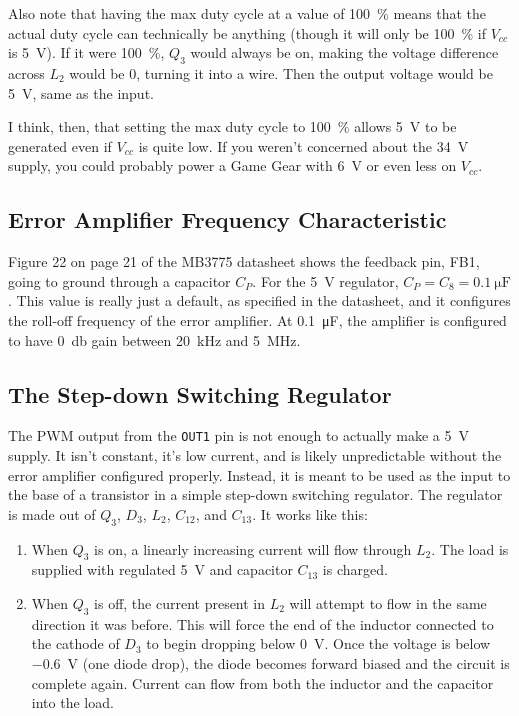 \documentclass{article}
\newcommand{\Vcc}{$V_{cc}$}
\newcommand{\chippin}{\texttt}
\newcommand{\model}{\textsf}
\begin{document}
Also note that having the max duty cycle at a value of \qty{100}{\%}
means that the actual duty cycle can technically be anything (though
it will only be \qty{100}{\%} if \Vcc{} is \qty{5}{\volt}). If it were
\qty{100}{\%}, $Q_3$ would always be on, making the voltage difference
across $L_2$ would be 0, turning it into a wire. Then the output
voltage would be \qty{5}{\volt}, same as the input.

I think, then, that setting the max duty cycle to \qty{100}{\%} allows
\qty{5}{\volt} to be generated even if \Vcc{} is quite low. If you
weren't concerned about the \qty{34}{\volt} supply, you could probably
power a Game Gear with \qty{6}{\volt} or even less on \Vcc{}.


\subsection{Error Amplifier Frequency Characteristic}
Figure 22 on page 21 of the \model{MB3775} datasheet shows the
feedback pin, FB1, going to ground through a capacitor $C_P$. For the
\qty{5}{\volt} regulator, $C_P = C_8 = \qty{0.1}{\micro\farad}$. This
value is really just a default, as specified in the datasheet, and it
configures the roll-off frequency of the error amplifier. At
\qty{0.1}{\micro\farad}, the amplifier is configured to have
\qty{0}{\decibel} gain between \qty{20}{\kilo\hertz} and
\qty{5}{\mega\hertz}.

\subsection{The Step-down Switching Regulator}
\label{sec:step-down_regulator}
The PWM output from the \chippin{OUT1} pin is not enough to actually
make a \qty{5}{\volt} supply. It isn't constant, it's low current, and
is likely unpredictable without the error amplifier configured
properly. Instead, it is meant to be used as the input to the base of
a transistor in a simple step-down switching regulator. The regulator
is made out of $Q_3$, $D_3$, $L_2$, $C_{12}$, and $C_{13}$. It works
like this:

\begin{enumerate}
\item When $Q_3$ is on, a linearly increasing current will flow
  through $L_2$. The load is supplied with regulated \qty{5}{\volt}
  and capacitor $C_{13}$ is charged.
\item When $Q_3$ is off, the current present in $L_2$ will attempt to
  flow in the same direction it was before. This will force the end of
  the inductor connected to the cathode of $D_3$ to begin dropping
  below \qty{0}{\volt}. Once the voltage is below \qty{-0.6}{\volt}
  (one diode drop), the diode becomes forward biased and the circuit
  is complete again. Current can flow from both the inductor and the
  capacitor into the load.
\end{enumerate}
\end{document}
